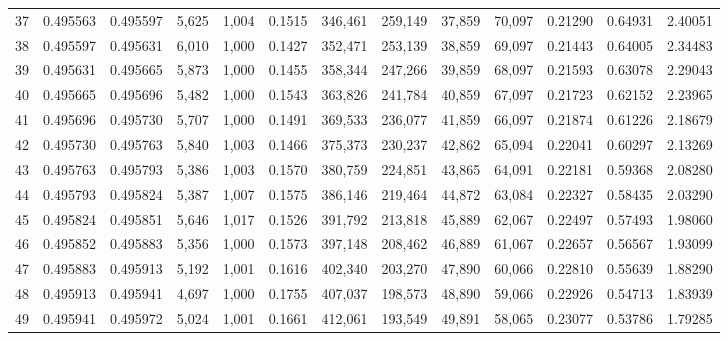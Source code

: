 \begin{tabular}{rrrrrrrrrrrrr}
37  &  0.495563 &  0.495597 &   5,625 &  1,004 &                                     0.1515 &  346,461 &  259,149 &   37,859 &   70,097 &  0.21290 &  0.64931 &  2.40051 \\
38  &  0.495597 &  0.495631 &   6,010 &  1,000 &                                     0.1427 &  352,471 &  253,139 &   38,859 &   69,097 &  0.21443 &  0.64005 &  2.34483 \\
39  &  0.495631 &  0.495665 &   5,873 &  1,000 &                                     0.1455 &  358,344 &  247,266 &   39,859 &   68,097 &  0.21593 &  0.63078 &  2.29043 \\
40  &  0.495665 &  0.495696 &   5,482 &  1,000 &                                     0.1543 &  363,826 &  241,784 &   40,859 &   67,097 &  0.21723 &  0.62152 &  2.23965 \\
41  &  0.495696 &  0.495730 &   5,707 &  1,000 &                                     0.1491 &  369,533 &  236,077 &   41,859 &   66,097 &  0.21874 &  0.61226 &  2.18679 \\
42  &  0.495730 &  0.495763 &   5,840 &  1,003 &                                     0.1466 &  375,373 &  230,237 &   42,862 &   65,094 &  0.22041 &  0.60297 &  2.13269 \\
43  &  0.495763 &  0.495793 &   5,386 &  1,003 &                                     0.1570 &  380,759 &  224,851 &   43,865 &   64,091 &  0.22181 &  0.59368 &  2.08280 \\
44  &  0.495793 &  0.495824 &   5,387 &  1,007 &                                     0.1575 &  386,146 &  219,464 &   44,872 &   63,084 &  0.22327 &  0.58435 &  2.03290 \\
45  &  0.495824 &  0.495851 &   5,646 &  1,017 &                                     0.1526 &  391,792 &  213,818 &   45,889 &   62,067 &  0.22497 &  0.57493 &  1.98060 \\
46  &  0.495852 &  0.495883 &   5,356 &  1,000 &                                     0.1573 &  397,148 &  208,462 &   46,889 &   61,067 &  0.22657 &  0.56567 &  1.93099 \\
47  &  0.495883 &  0.495913 &   5,192 &  1,001 &                                     0.1616 &  402,340 &  203,270 &   47,890 &   60,066 &  0.22810 &  0.55639 &  1.88290 \\
48  &  0.495913 &  0.495941 &   4,697 &  1,000 &                                     0.1755 &  407,037 &  198,573 &   48,890 &   59,066 &  0.22926 &  0.54713 &  1.83939 \\
49  &  0.495941 &  0.495972 &   5,024 &  1,001 &                                     0.1661 &  412,061 &  193,549 &   49,891 &   58,065 &  0.23077 &  0.53786 &  1.79285 \\

\end{tabular}
